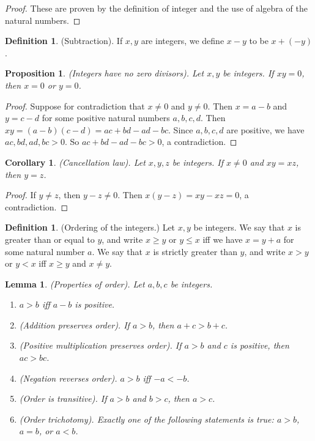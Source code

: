 \documentclass[12pt]{article}
\newtheorem{corollary}[theorem]{Corollary}
\newtheorem{lemma}[theorem]{Lemma}
\newtheorem{proposition}[theorem]{Proposition}
\theoremstyle{definition}
\newtheorem{definition}[theorem]{Definition}
\theoremstyle{remark}
\begin{document}
\begin{proof}
    These are proven by the definition of integer and the use of algebra of the natural numbers.
\end{proof}

\begin{definition}
    (Subtraction). If $x, y$ are integers, we define $x-y$ to be $x + (-y)$.
\end{definition}

\begin{proposition}
    (Integers have no zero divisors). Let $x, y$ be integers. If $xy = 0$, then $x = 0$ or $y = 0$.
\end{proposition}

\begin{proof}
    Suppose for contradiction that $x \neq 0$ and $y \neq 0$. Then $x = a-b$ and $y = c-d$ for some positive natural numbers $a,b,c,d$. Then $xy = (a-b)(c-d) = ac + bd - ad - bc$. Since $a,b,c,d$ are positive, we have $ac, bd, ad, bc > 0$. So $ac + bd - ad - bc > 0$, a contradiction.
\end{proof}

\begin{corollary}
    (Cancellation law). Let $x, y, z$ be integers. If $x \neq 0$ and $xy = xz$, then $y = z$.
\end{corollary}

\begin{proof}
    If $y \neq z$, then $y-z \neq 0$. Then $x(y-z) = xy - xz = 0$, a contradiction.
\end{proof}

\begin{definition}
    (Ordering of the integers.) Let $x, y$ be integers. We say that $x$ is greater than or equal to $y$, and write $x \geq y$ or $y \leq x$ iff we have $x = y + a$ for some natural number $a$. We say that $x$ is strictly greater than $y$, and write $x > y$ or $y < x$ iff $x \geq y$ and $x \neq y$.
\end{definition}

\begin{lemma}
    (Properties of order). Let $a, b, c$ be integers.
    \begin{enumerate}
        \item $a > b$ iff $a - b$ is positive.
        \item (Addition preserves order). If $a > b$, then $a + c > b + c$.
        \item (Positive multiplication preserves order). If $a > b$ and $c$ is positive, then $ac > bc$.
        \item (Negation reverses order). $a > b$ iff $-a < -b$.
        \item (Order is transitive). If $a > b$ and $b > c$, then $a > c$.
        \item (Order trichotomy). Exactly one of the following statements is true: $a > b$, $a = b$, or $a < b$.
    \end{enumerate}
\end{lemma}
\end{document}
